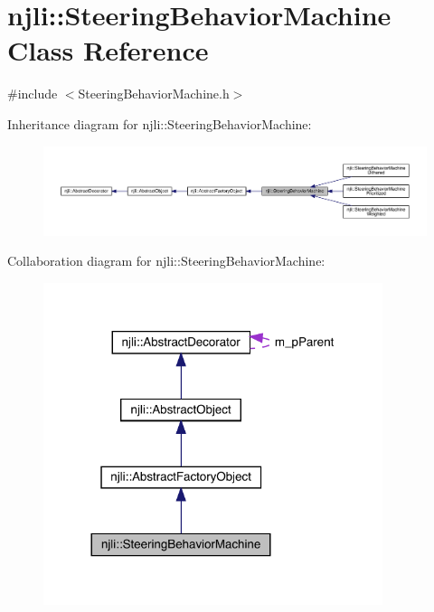 \hypertarget{classnjli_1_1_steering_behavior_machine}{}\section{njli\+:\+:Steering\+Behavior\+Machine Class Reference}
\label{classnjli_1_1_steering_behavior_machine}


{\ttfamily \#include $<$Steering\+Behavior\+Machine.\+h$>$}



Inheritance diagram for njli\+:\+:Steering\+Behavior\+Machine\+:\nopagebreak
\begin{figure}[H]
\begin{center}
\leavevmode
\includegraphics[width=350pt]{classnjli_1_1_steering_behavior_machine__inherit__graph}
\end{center}
\end{figure}


Collaboration diagram for njli\+:\+:Steering\+Behavior\+Machine\+:\nopagebreak
\begin{figure}[H]
\begin{center}
\leavevmode
\includegraphics[width=281pt]{classnjli_1_1_steering_behavior_machine__coll__graph}
\end{center}
\end{figure}
